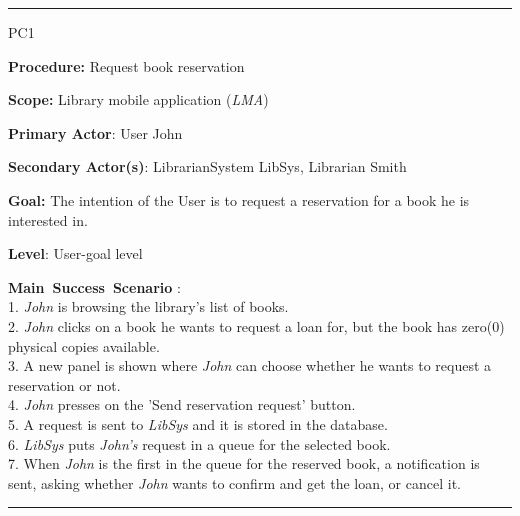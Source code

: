 %

\vspace{0.5cm}
\hrule
\begin{lyxlist}{PC1}
\small{
\item [\textbf{Procedure:}] Request book reservation
\item [\textbf{Scope:}] Library mobile application (\emph{LMA})
\item [\textbf{Primary Actor}:] User John
\item [\textbf{Secondary Actor(s)}:] LibrarianSystem LibSys,
Librarian Smith
\item [\textbf{Goal:}] The intention of the User is to request a reservation for
a book he is interested in.
\item [\textbf{Level}:] User-goal level
\item [\textbf{Main~Success~Scenario}]:\\
1. \emph{John} is browsing the library's list of books. \\
2. \emph{John} clicks on a book he wants to request a loan for, but the book has
zero(0) physical copies available.\\
3. A new panel is shown where \emph{John} can choose whether he wants to
request a reservation or not. \\
4. \emph{John} presses on the 'Send reservation request' button. \\
5. A request is sent to \emph{LibSys} and it is stored in the database. \\
6. \emph{LibSys} puts \emph{John's} request in a queue for the selected book. \\ 
7. When \emph{John} is the first in the queue for the reserved book, a
notification is sent, asking whether \emph{John} wants to confirm and get the
loan, or cancel it. \\

}

\end{lyxlist}
\hrule



